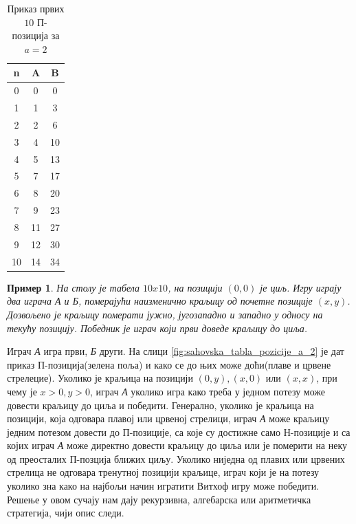 \documentclass[a4paper]{article}
\newtheorem{example}{Пример}
\begin{document}
\begin{table}[h!]
	\caption{Приказ првих $ 10 $ П-позиција за $ a = 2 $}
	\label{tab:a_2_Ppozicije}
	\begin{center}
		\begin{tabular}{  c | c | c }
			{\textbf{n}} &  {\textbf{A}} &  {\textbf{B}} \\
			\hline
			0 & 0 & 0 \\
			1 & 1 & 3 \\
			2 & 2 & 6 \\
			3 & 4 & 10 \\
			4 & 5 & 13 \\
			5 & 7 & 17 \\
			6 & 8 & 20 \\
			7 & 9 & 23 \\
			8 & 11 & 27 \\
			9 & 12 & 30 \\
			10 & 14 & 34\\ 
		\end{tabular}
	\end{center}
\end{table}

\begin{example}
	На столу је табела $ 10x10 $, на позицији $ (0, 0) $ је циљ. Игру играју два играча \textit{А} и \textit{Б}, померајући наизменично краљицу од почетне позиције $ (x,y) $. Дозвољено је краљицу померати јужно, југозападно и западно у односу на текућу позицију.  Победник је играч који први доведе краљицу до циља.
\end{example}

Играч \textit{А} игра први, \textit{Б} други. На слици \ref{fig:sahovska_tabla_pozicije_a_2} је дат приказ П-позиција(зелена поља) и како се до њих може доћи(плаве и црвене стрелецие). Уколико је краљица на позицији $ (0, y), (x,0) $ или $ (x,x) $, при чему је $ x > 0, y > 0 $, играч \textit{А} уколико игра како треба у једном потезу може довести краљицу до циља и победити. Генерално, уколико је краљица на позицији, која одговара плавој или црвеној стрелици, играч \textit{А} може краљицу једним потезом довести до П-позиције, са које су достижне само Н-позиције и са којих играч \textit{А} може директно довести краљицу до циља или је померити на неку од преосталих П-позција ближих циљу. Уколико ниједна од плавих или црвених стрелица не одговара тренутној позицији краљице, играч који је на потезу уколико зна како на најбољи начин игратити Витхоф игру може победити. Решење у овом сучају нам дају рекурзивна, алгебарска или аритметичка стратегија, чији опис следи.
 
\end{document}
